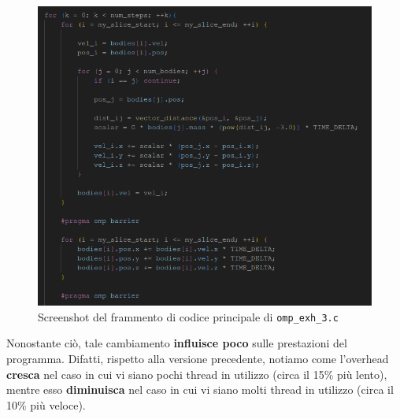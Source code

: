\documentclass[12pt]{report}
\begin{document}
    \begin{figure}[H]
        \centering
        \includegraphics[width=\textwidth]{images/omp_exh_3_2.png}
        \caption{Screenshot del frammento di codice principale di \texttt{omp\_exh\_3.c}}
        \label{fig:omp_exh_3}
    \end{figure}

    Nonostante ciò, tale cambiamento \textbf{influisce poco} sulle prestazioni del programma. Difatti, rispetto alla versione precedente, notiamo come l'overhead \textbf{cresca} nel caso in cui vi siano pochi thread in utilizzo (circa il 15\% più lento), mentre esso \textbf{diminuisca} nel caso in cui vi siano molti thread in utilizzo (circa il 10\% più veloce).
\end{document}
